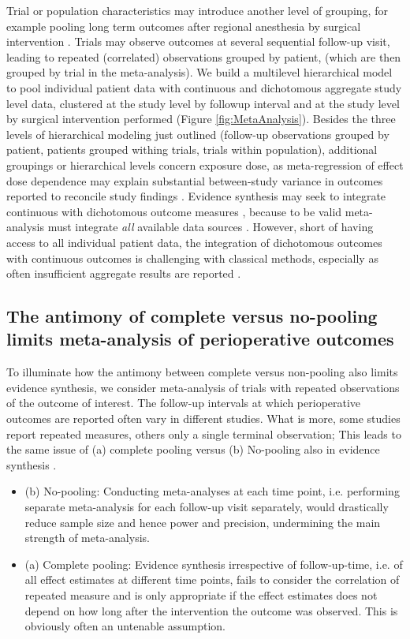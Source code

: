 \documentclass[11pt,notitlepage]{article}
\begin{document}
Trial or population characteristics may introduce another level of grouping, for example pooling long term outcomes after regional anesthesia by surgical intervention \cite{Andreae2013,Abroug2011}. Trials may observe outcomes at several sequential follow-up visit, leading to repeated (correlated) observations grouped by patient, (which are then grouped by trial in the  meta-analysis).  We build a multilevel hierarchical model to pool individual patient data with continuous and dichotomous aggregate study level data, clustered at the study level by followup interval and at the study level by surgical intervention performed (Figure \ref{fig:MetaAnalysis}). Besides the three levels of hierarchical modeling just outlined (follow-up observations grouped by patient, patients grouped withing trials, trials within population), additional groupings or hierarchical levels concern exposure dose, as meta-regression of effect dose dependence may explain substantial between-study variance in outcomes reported to reconcile study findings \cite{Andreae2015}. Evidence synthesis may seek to integrate continuous with dichotomous outcome measures \cite{AndreaeJohnsonAbstract2013}, because to be valid meta-analysis must integrate \textit{all} available data sources \cite{Deeks2011chapter}. However, short of having access to all individual patient data, the integration of dichotomous outcomes with continuous outcomes is challenging with classical methods\cite{Andreae2015}, especially as often insufficient aggregate results are reported \cite{Roth2015CriticalCare}. 

\subsection*{The antimony of complete versus no-pooling limits meta-analysis of perioperative outcomes}
To illuminate how the antimony between complete versus non-pooling also limits evidence synthesis, we consider meta-analysis of trials with repeated observations of the outcome of interest. The follow-up intervals at which perioperative outcomes are reported often vary in different studies. What is more, some studies report repeated measures, others only a single terminal observation; This leads to the same issue of (a) complete pooling versus (b) No-pooling also in evidence synthesis \cite{Roth2015CriticalCare}.

\begin{itemize}
\item (b) No-pooling: 
Conducting meta-analyses at each time point, i.e. performing separate meta-analysis for each follow-up visit separately, would drastically reduce sample size and hence power and precision, undermining the main strength of meta-analysis.
\item (a) Complete pooling:
Evidence synthesis irrespective of follow-up-time, i.e. of all effect estimates at different time points, fails to consider the correlation of repeated measure and is only appropriate if the effect estimates does not depend on how long after the intervention the outcome was observed. This is obviously often an untenable assumption.
\end{itemize}
\end{document}
